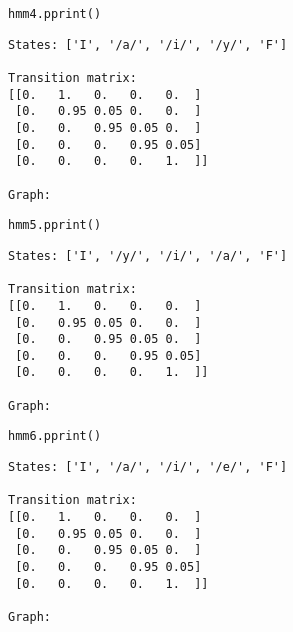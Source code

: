 \documentclass[11pt]{article}
\begin{document}
\begin{center}

\end{center}

\begin{verbatim}
hmm4.pprint()
\end{verbatim}

\begin{verbatim}
States: ['I', '/a/', '/i/', '/y/', 'F']

Transition matrix:
[[0.   1.   0.   0.   0.  ]
 [0.   0.95 0.05 0.   0.  ]
 [0.   0.   0.95 0.05 0.  ]
 [0.   0.   0.   0.95 0.05]
 [0.   0.   0.   0.   1.  ]]

Graph:
\end{verbatim}

\begin{center}

\end{center}

\begin{verbatim}
hmm5.pprint()
\end{verbatim}

\begin{verbatim}
States: ['I', '/y/', '/i/', '/a/', 'F']

Transition matrix:
[[0.   1.   0.   0.   0.  ]
 [0.   0.95 0.05 0.   0.  ]
 [0.   0.   0.95 0.05 0.  ]
 [0.   0.   0.   0.95 0.05]
 [0.   0.   0.   0.   1.  ]]

Graph:
\end{verbatim}

\begin{center}

\end{center}

\begin{verbatim}
hmm6.pprint()
\end{verbatim}

\begin{verbatim}
States: ['I', '/a/', '/i/', '/e/', 'F']

Transition matrix:
[[0.   1.   0.   0.   0.  ]
 [0.   0.95 0.05 0.   0.  ]
 [0.   0.   0.95 0.05 0.  ]
 [0.   0.   0.   0.95 0.05]
 [0.   0.   0.   0.   1.  ]]

Graph:
\end{verbatim}

\begin{center}

\end{center}
\end{document}
